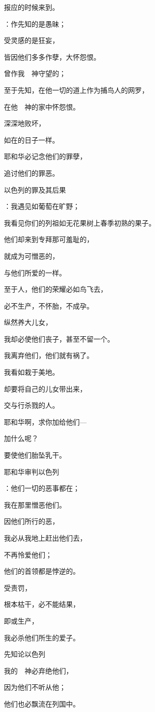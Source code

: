 {\par }{\Q 报应的时候来到。
\par }{：作先知的是愚昧；
\par }{\Q 受灵感的是狂妄，
\par }{\Q 皆因他们多多作孽，大怀怨恨。
\par }{\Q {}曾作我　神守望的；
\par }{\Q 至于先知，在他一切的道上作为捕鸟人的网罗，
\par }{\Q 在他　神的家中怀怨恨。
\par }{\Q {}深深地败坏，
\par }{\Q 如在{}的日子一样。
\par }{\Q 耶和华必记念他们的罪孽，
\par }{\Q 追讨他们的罪恶。
\par }{\SH 以色列的罪及其后果
\par }{\Q {}：我遇见{}如葡萄在旷野；
\par }{\Q 我看见你们的列祖如无花果树上春季初熟的果子。
\par }{\Q 他们却来到{}专拜那可羞耻的，
\par }{\Q 就成为可憎恶的，
\par }{\Q 与他们所爱的一样。
\par }{\Q {}至于{}人，他们的荣耀必如鸟飞去，
\par }{\Q 必不生产，不怀胎，不成孕。
\par }{\Q {}纵然养大儿女，
\par }{\Q 我却必使他们丧子，甚至不留一个。
\par }{\Q 我离弃他们，他们就有祸了。
\par }{\Q {}我看{}如{}栽于美地。
\par }{却要将自己的儿女带出来，
\par }{\Q 交与行杀戮的人。
\par }{\Q {}耶和华啊，求你加给他们—
\par }{\Q 加什么呢？
\par }{\Q 要使他们胎坠乳干。
\par }{\SH 耶和华审判以色列
\par }{\Q {}：他们一切的恶事都在{}；
\par }{\Q 我在那里憎恶他们。
\par }{\Q 因他们所行的恶，
\par }{\Q 我必从我地上赶出他们去，
\par }{\Q 不再怜爱他们；
\par }{\Q 他们的首领都是悖逆的。
\par }{\Q {}受责罚，
\par }{\Q 根本枯干，必不能结果，
\par }{\Q 即或生产，
\par }{\Q 我必杀他们所生的爱子。
\par }{\SH 先知论以色列
\par }{\Q {}我的　神必弃绝他们，
\par }{\Q 因为他们不听从他；
\par }{\Q 他们也必飘流在列国中。

}
